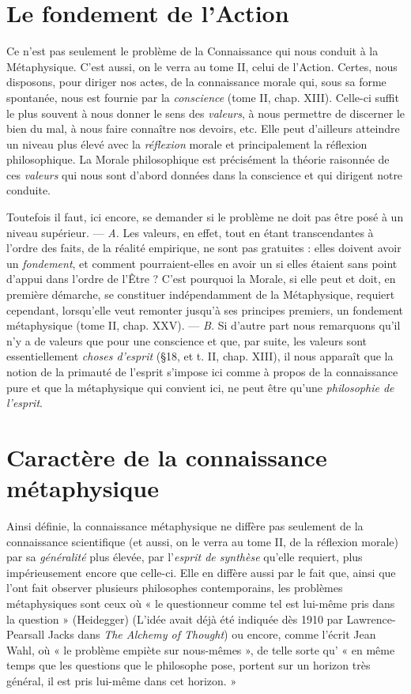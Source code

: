 \section{Le fondement de l’Action}%
Ce n’est pas seulement le
problème de la Connaissance qui nous conduit à la Métaphysique.
C’est aussi, on le verra au tome II, celui de l’Action. Certes, nous
disposons, pour diriger nos actes, de la connaissance morale qui, sous
sa forme spontanée, nous est fournie par la {\it conscience} (tome II,
chap. XIII). Celle-ci suffit le plus souvent à nous donner le sens des
{\it valeurs}, à nous permettre de discerner le bien du mal, à nous faire
connaître nos devoirs, etc. Elle peut d’ailleurs atteindre un niveau plus
élevé avec la {\it réflexion} morale et principalement la réflexion philosophique.
La Morale philosophique est précisément la théorie raisonnée
de ces {\it valeurs} qui nous sont d’abord données dans la conscience et
qui dirigent notre conduite.

Toutefois il faut, ici encore, se demander si le problème ne doit pas
être posé à un niveau supérieur. — {\it A.} Les valeurs, en effet, tout en
étant transcendantes à l’ordre des faits, de la réalité empirique, ne
sont pas gratuites : elles doivent avoir un {\it fondement}, et comment
pourraient-elles en avoir un si elles étaient sans point d’appui dans
l'ordre de l’Être ? C’est pourquoi la Morale, si elle peut et doit, en
première démarche, se constituer indépendamment de la Métaphysique,
requiert cependant, lorsqu'elle veut remonter jusqu’à ses principes
premiers, un fondement métaphysique (tome II, chap. XXV).
— {\it B.} Si d’autre part nous remarquons qu’il n’y a de valeurs que pour
une conscience et que, par suite, les valeurs sont essentiellement
{\it choses d’esprit} (\S 18, et t. II, chap. XIII), il nous apparaît que la notion
de la primauté de l’esprit s’impose ici comme à propos de la connaissance
pure et que la métaphysique qui convient ici, ne peut être
qu’une {\it philosophie de l'esprit}.

\section{Caractère de la connaissance métaphysique}%
Ainsi définie, la connaissance métaphysique ne diffère pas seulement de la
connaissance scientifique (et aussi, on le verra au tome II, de la
réflexion morale) par sa {\it généralité} plus élevée, par l’{\it esprit de synthèse}
qu’elle requiert, plus impérieusement encore que celle-ci. Elle en
diffère aussi par le fait que, ainsi que l’ont fait observer plusieurs
philosophes contemporains, les problèmes métaphysiques sont ceux
où « le questionneur comme tel est lui-même pris dans la question »
(Heidegger)
{\scriptsize (L'idée avait déjà été indiquée dès 1910 par Lawrence-Pearsall
Jacks dans {\it The Alchemy of Thought})}
ou encore, comme l'écrit Jean Wahl, où « le problème
empiète sur nous-mêmes », de telle sorte qu’ « en même temps que les
questions que le philosophe pose, portent sur un horizon très général,
il est pris lui-même dans cet horizon. »

